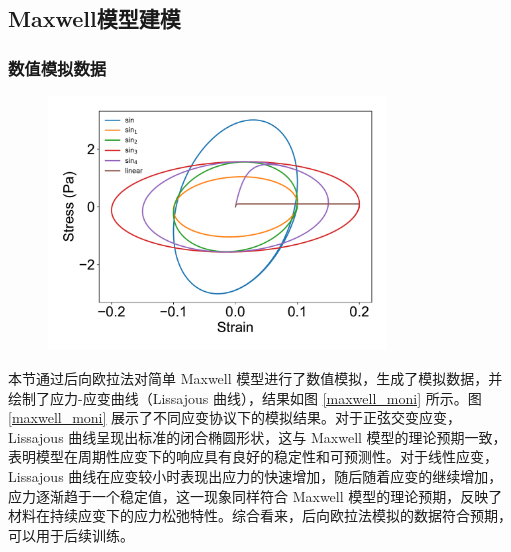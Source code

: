 \subsection{Maxwell模型建模}
\subsubsection{数值模拟数据}
\begin{figure}[htbp]
  \centering
  \includegraphics[width=0.8\textwidth]{Fig/maxwell_moni.pdf}
\end{figure}
本节通过后向欧拉法对简单 Maxwell 模型进行了数值模拟，生成了模拟数据，并绘制了应力-应变曲线（Lissajous 曲线），结果如图 \ref{maxwell_moni} 所示。图 \ref{maxwell_moni} 展示了不同应变协议下的模拟结果。对于正弦交变应变，Lissajous 曲线呈现出标准的闭合椭圆形状，这与 Maxwell 模型的理论预期一致，表明模型在周期性应变下的响应具有良好的稳定性和可预测性。对于线性应变，Lissajous 曲线在应变较小时表现出应力的快速增加，随后随着应变的继续增加，应力逐渐趋于一个稳定值，这一现象同样符合 Maxwell 模型的理论预期，反映了材料在持续应变下的应力松弛特性。综合看来，后向欧拉法模拟的数据符合预期，可以用于后续训练。


